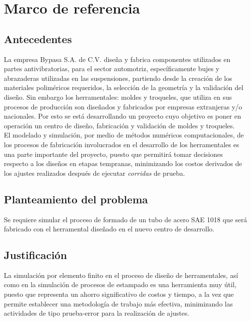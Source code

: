 \chapter{Marco de referencia}

\section{Antecedentes}

La empresa Bypasa S.A. de C.V. diseña y fabrica componentes utilizados en partes antivibratorias, para el sector 
automotriz, específicamente bujes y abrazaderas utilizadas en las suspensiones, 
partiendo desde la creación de los materiales poliméricos requeridos, la 
selección de la geometría y la validación del diseño. Sin embargo los herramentales: moldes y troqueles,  
que utiliza en sus procesos de producción son diseñados y fabricados por empresas extranjeras y/o 
nacionales. Por esto se está desarrollando un proyecto cuyo objetivo es poner en operación un centro 
de diseño, fabricación y validación de moldes y troqueles.\\

El modelado y simulación, por medio de métodos numéricos computacionales, de los procesos de fabricación 
involucrados en el desarrollo de los herramentales es una parte importante del proyecto, puesto que 
permitirá tomar decisiones respecto a los diseños en etapas tempranas, minimizando los costos derivados de 
los ajustes realizados después de ejecutar \textit{corridas} de prueba.

\section{Planteamiento del problema}

Se requiere simular el proceso de formado de un tubo de acero SAE 1018 que será fabricado con el herramental 
diseñado en el nuevo centro de desarrollo.

\section{Justificación}

La simulación por elemento finito en el proceso de diseño de herramentales, así como en 
la simulación de procesos de estampado es una herramienta muy útil, puesto que representa un ahorro 
significativo de costos y tiempo, a la vez que permite establecer una metodología de trabajo más efectiva, minimizando las 
actividades de tipo prueba-error para la realización de ajustes.\\

